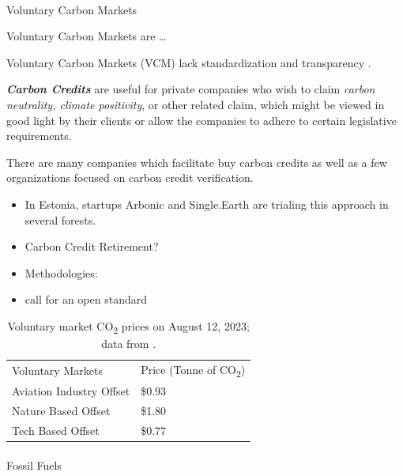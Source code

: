 \documentclass[
  letterpaper,
  DIV=11,
  numbers=noendperiod]{scrartcl}
\makeatletter
\let\oldparagraph\paragraph
\renewcommand{\paragraph}{
    \@ifstar
      \xxxParagraphStar
      \xxxParagraphNoStar
  }
\newcommand{\xxxParagraphStar}[1]{\oldparagraph*{#1}\mbox{}}
\newcommand{\xxxParagraphNoStar}[1]{\oldparagraph{#1}\mbox{}}
\providecommand{\tightlist}{%
  \setlength{\itemsep}{0pt}\setlength{\parskip}{0pt}}\usepackage{longtable,booktabs,array}
\makeatother
\begin{document}
\paragraph{Voluntary Carbon Markets}\label{voluntary-carbon-markets}

Voluntary Carbon Markets are \ldots{}

Voluntary Carbon Markets (VCM) lack standardization and transparency
\citep{elakhodaiWhyVCMNeeds2023}.

\textbf{\emph{Carbon Credits}} are useful for private companies who wish
to claim \emph{carbon neutrality, climate positivity}, or other related
claim, which might be viewed in good light by their clients or allow the
companies to adhere to certain legislative requirements.

There are many companies which facilitate buy carbon credits as well as
a few organizations focused on carbon credit verification.

\begin{itemize}
\tightlist
\item
  In Estonia, startups Arbonic and Single.Earth are trialing this
  approach in several forests.
\item
  Carbon Credit Retirement?
\item
  Methodologies: \citet{MethodologyGHGCoBenefits2022}
\item
  \citet{klimadaoOpenCallAlternative2023} call for an open standard
\end{itemize}

\begin{longtable}[]{@{}ll@{}}
\caption{Voluntary market CO\textsubscript{2} prices on August 12, 2023;
data from \citep{carboncreditsLiveCarbonPrices2023}.}\tabularnewline
\toprule\noalign{}
\endfirsthead
\endhead
\bottomrule\noalign{}
\endlastfoot
Voluntary Markets & Price (Tonne of CO\textsubscript{2}) \\
Aviation Industry Offset & \$0.93 \\
Nature Based Offset & \$1.80 \\
Tech Based Offset & \$0.77 \\
\end{longtable}

\paragraph{Fossil Fuels}\label{fossil-fuels}
\end{document}
